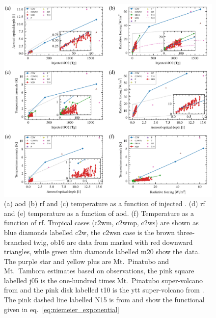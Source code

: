 \documentclass{ametsocV6.1}
\newcommand{\iso}[1][i]{{#1}njected \ce{SO2}}
\begin{document}
\begin{figure}
  \centering
  \includegraphics[width=0.95\linewidth]{figures/figure5.png}

  \caption{(a) \gls{aod} (b) \gls{rf} and (c) temperature as a function of \iso{}\@. (d)
    \gls{rf} and (e) temperature as a function of \gls{aod}. (f) Temperature as a function
    of \gls{rf}. Tropical cases (\gls{c2wm}, \gls{c2wmp}, \gls{c2ws}) are shown as blue
    diamonds labelled \gls{c2w}, the \gls{c2wsn} case is the brown three-branched twig,
    \gls{ob16} are data from \citet{ottobliesner2016} marked with red downward triangles,
    while green thin diamonds labelled \gls{m20} show the \citet{marshall2020dataset} data.
    The purple star and yellow plus are Mt.\ Pinatubo and Mt.\ Tambora estimates based on
    observations, the pink square labelled \gls{j05} is the one-hundred times Mt.\ Pinatubo
    super-volcano from \citet{jones2005} and the pink disk labelled \gls{t10} is the
    \gls{ytt} super-volcano from \citet{timmreck2010}. The pink dashed line labelled N15 is
    from \citet{niemeier2015} and show the functional given in
    eq.~\ref{eq:niemeier_exponential}}\label{fig:parameter_scan}%
\end{figure}
\end{document}
